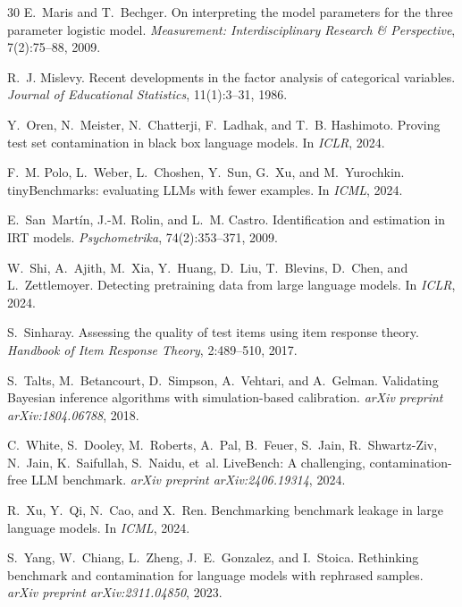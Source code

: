\documentclass[letterpaper]{article}
\begin{document}
\begin{thebibliography}{30}
E.~Maris and T.~Bechger.
\newblock On interpreting the model parameters for the three parameter logistic model.
\newblock \emph{Measurement: Interdisciplinary Research \& Perspective}, 7(2):75--88, 2009.

R.~J. Mislevy.
\newblock Recent developments in the factor analysis of categorical variables.
\newblock \emph{Journal of Educational Statistics}, 11(1):3--31, 1986.

Y.~Oren, N.~Meister, N.~Chatterji, F.~Ladhak, and T.~B. Hashimoto.
\newblock Proving test set contamination in black box language models.
\newblock In \emph{ICLR}, 2024.

F.~M. Polo, L.~Weber, L.~Choshen, Y.~Sun, G.~Xu, and M.~Yurochkin.
\newblock tiny{B}enchmarks: evaluating {LLM}s with fewer examples.
\newblock In \emph{ICML}, 2024.

E.~San~Mart\'{i}n, J.-M. Rolin, and L.~M. Castro.
\newblock Identification and estimation in {IRT} models.
\newblock \emph{Psychometrika}, 74(2):353--371, 2009.

W.~Shi, A.~Ajith, M.~Xia, Y.~Huang, D.~Liu, T.~Blevins, D.~Chen, and L.~Zettlemoyer.
\newblock Detecting pretraining data from large language models.
\newblock In \emph{ICLR}, 2024.

S.~Sinharay.
\newblock Assessing the quality of test items using item response theory.
\newblock \emph{Handbook of Item Response Theory}, 2:489--510, 2017.

S.~Talts, M.~Betancourt, D.~Simpson, A.~Vehtari, and A.~Gelman.
\newblock Validating {B}ayesian inference algorithms with simulation-based calibration.
\newblock \emph{arXiv preprint arXiv:1804.06788}, 2018.

C.~White, S.~Dooley, M.~Roberts, A.~Pal, B.~Feuer, S.~Jain, R.~Shwartz-Ziv, N.~Jain, K.~Saifullah, S.~Naidu, et~al.
\newblock Live{B}ench: A challenging, contamination-free {LLM} benchmark.
\newblock \emph{arXiv preprint arXiv:2406.19314}, 2024.

R.~Xu, Y.~Qi, N.~Cao, and X.~Ren.
\newblock Benchmarking benchmark leakage in large language models.
\newblock In \emph{ICML}, 2024.

S.~Yang, W.~Chiang, L.~Zheng, J.~E.~Gonzalez, and I.~Stoica.
\newblock Rethinking benchmark and contamination for language models with rephrased samples.
\newblock \emph{arXiv preprint arXiv:2311.04850}, 2023.

\end{thebibliography}
\end{document}
